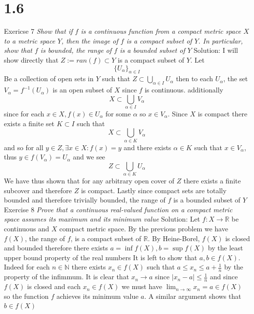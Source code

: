 \documentclass[11pt]{article}
\newcommand{\solution}[1]{{{\textcolor{header}{Solution:} \textcolor{solution}{#1}}}}
\begin{document}
\section{1.6}
Exericse 7
\emph{
    Show that if $f$ is a continuous function from a compact metric space $X$ to a metric space $Y$, then the image of $f$ is a compact subset of $ Y$. In
    particular, show that  $f$ is bounded, the range of $f$ is a bounded subset of $ Y$
}
\solution{
    I will show directly that  $Z := ran(f) \subset Y$ is a compact subset of $ Y$. Let
    \[
        \{U_\alpha\}_{\alpha \in I}
    \] 
    Be a collection of open sets in $ Y$ such that $Z \subset \bigcup_{\alpha \in I} U_\alpha$ then to each $U_\alpha$, the set $V_\alpha = f^{-1}(U_\alpha)$ is an open  subset of $X$ since $f$ is continuous. additionally 
    \[
        X \subset \bigcup_{\alpha \in I} V_\alpha
    \] 
    since for each $x \in X, f(x) \in U_\alpha$ for some $ \alpha$ so $x \in V_\alpha$. Since $X$ is compact there exists a finite set  $K \subset I$ such that
    \[
        X \subset \bigcup_{\alpha \in K} V_\alpha
    \] 
    and so for all $y \in Z, \exists x \in X : f(x) = y$ and there exists $\alpha \in K$ such that $x \in V_\alpha$, thus
    $y \in f(V_\alpha) = U_\alpha$ and we see
    \[
        Z \subset \bigcup_{\alpha \in K} U_\alpha
    \] 
    We have thus shown that for any arbitrary open cover of $Z$ there exists a finite subcover and therefore $Z$ is compact.
    Lastly since compact sets are totally bounded and therefore trivially bounded, the range of $f$ is a bounded subset of  $ Y$
}
\\
Exercise 8
\emph{
   Prove that a continuous real-valued function on a compact metric space assumes its maximum and its minimum value 
}
\solution{
    Let $f: X \to \mathbb{R}$ be continuous and $X$ compact metric space. By the previous problem we have  $f(X)$, the range of  $f$, is a
    compact subset of $ \mathbb{R}$. By Heine-Borel, $f(X)$ is closed and bounded therefore there exists  $a = \inf f(X), b = \sup f(X)$ by the least upper bound property of the real numbers
    It is left to show that  $a,b \in f(X)$. Indeed for each $n \in \mathbb{N}$ there exists $x_n \in f(X)$ such that  $a \le x_n \le a + \frac{1}{n}$ by the property of the infimmum.
    It is clear that $x_n \to a$ since $|x_n- a| \le \frac{1}{n}$ and since  $f(X)$ is closed and each  $x_n \in f(X)$ we must have  $\lim_{n\to \infty}x_n = a \in f(X)$ so the function $f$ achieves its minimum value $a$.
    A similar argument shows that  $b \in f(X)$
}
\\ \\
\end{document}
